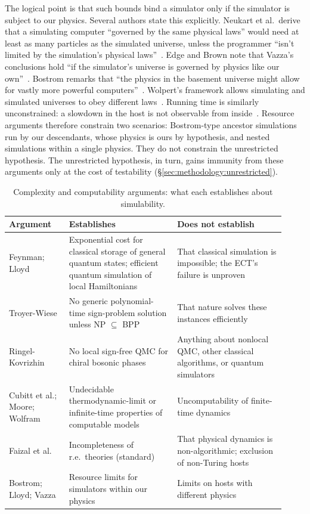The logical point is that such bounds bind a simulator only if the simulator
is subject to our physics. Several authors state this explicitly. Neukart et
al.\ derive that a simulating computer ``governed by the same physical laws''
would need at least as many particles as the simulated universe, unless the
programmer ``isn't limited by the simulation's physical
laws''~\cite{Neukart2022do}. Edge and Brown note that Vazza's conclusions hold
``if the simulator's universe is governed by physics like our
own''~\cite{Edge2026commentary}. Bostrom remarks that ``the physics in the
basement universe might allow for vastly more powerful
computers''~\cite{Bostrom2025simulation}. Wolpert's framework allows
simulating and simulated universes to obey different laws~\cite{Wolpert2025what}.
Running time is similarly unconstrained: a slowdown in the host is not
observable from inside~\cite{Aaronson2017because}. Resource arguments therefore
constrain two scenarios: Bostrom-type ancestor simulations run by our
descendants, whose physics is ours by hypothesis, and nested simulations
within a single physics. They do not constrain the unrestricted hypothesis.
The unrestricted hypothesis, in turn, gains immunity from these arguments only
at the cost of testability (\S\ref{sec:methodology:unrestricted}).

\begin{table}[t]
\centering
\small
\caption{Complexity and computability arguments: what each establishes about
simulability.}
\label{tab:complexity}
\begin{tabular}{p{0.2\linewidth}p{0.36\linewidth}p{0.36\linewidth}}
\hline
Argument & Establishes & Does not establish \\
\hline
Feynman; Lloyd & Exponential cost for classical storage of general quantum states; efficient quantum simulation of local Hamiltonians & That classical simulation is impossible; the ECT's failure is unproven \\
Troyer-Wiese & No generic polynomial-time sign-problem solution unless NP $\subseteq$ BPP & That nature solves these instances efficiently \\
Ringel-Kovrizhin & No local sign-free QMC for chiral bosonic phases & Anything about nonlocal QMC, other classical algorithms, or quantum simulators \\
Cubitt et al.; Moore; Wolfram & Undecidable thermodynamic-limit or infinite-time properties of computable models & Uncomputability of finite-time dynamics \\
Faizal et al. & Incompleteness of r.e.\ theories (standard) & That physical dynamics is non-algorithmic; exclusion of non-Turing hosts \\
Bostrom; Lloyd; Vazza & Resource limits for simulators within our physics & Limits on hosts with different physics \\
\hline
\end{tabular}
\end{table}

